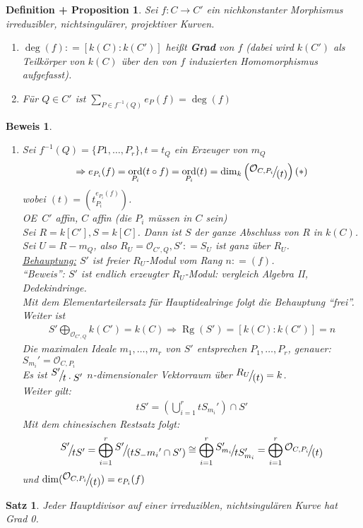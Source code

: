 \documentclass[a4paper,12pt]{report}
\theoremstyle{break}
\newtheorem{Satz}{Satz}
\newtheorem{DefProp}[Def]{Definition + Proposition}
\theoremstyle{nonumberbreak}
\theoremstyle{nonumberplain}
\newtheorem{Bew}{Beweis}
\newcommand{\emp}[1]{\textbf{\emph{#1}}}
\newcommand{\begriff}[1]{{\index{#1}}\emp{#1}}
\newcommand{\defeqr}[0]{\mathrel{\mathop:}=}
\DeclareMathOperator{\Rg}{Rg}
\DeclareMathOperator{\ord}{ord}
\newcommand{\FakRaum}[2]{
  \raisebox{0.7ex}{\ensuremath{#1}}
  \ensuremath{\mkern-3mu}\big/\ensuremath{\mkern-3mu}
  \raisebox{-0.6ex}{\ensuremath{#2}}}
\renewcommand{\OE}{O\!\!E~}
\begin{document}
\begin{DefProp}
  \label{defprop:19.4}
  Sei $f:C\longrightarrow C'$ ein nichkonstanter Morphismus irreduzibler, nichtsingulärer, projektiver Kurven.
  \begin{enumerate}
  \item $\deg(f)\defeqr[k(C):k(C')]$ heißt \begriff{Grad} von $f$ (dabei wird $k(C')$ als Teilkörper von $k(C)$
    über den von $f$ induzierten Homomorphismus aufgefasst).
  \item Für $Q\in C'$ ist $\sum_{P\in f^{-1}(Q)}e_P(f)=\deg(f)$
  \end{enumerate}
\end{DefProp}
\begin{Bew}
  \begin{enumerate}
  \item[b.)] Sei $f^{-1}(Q)=\{P1,\dots,P_r\}, t=t_Q$ ein Erzeuger von $m_Q$
    \begin{align*}
      \Rightarrow e_{P_i}(f)=\ord_{P_i}(t\circ f)=\ord_{P_i}(t)=\dim_k\left(\FakRaum{\mathcal O_{C,P_i}}{(t)}\right) (*)
    \end{align*}
    wobei $(t)=\left(t_{P_i}^{e_{P_i}(f)}\right)$. \\
    \OE $C'$ affin, $C$ affin (die $P_i$ müssen in $C$ sein) \\
    Sei $R=k[C'], S=k[C]$. Dann ist $S$ der ganze Abschluss von $R$ in $k(C)$. Sei $U=R-m_Q$, also $R_U=\mathcal O_{C',Q}, S'\defeqr S_U$
    ist ganz über $R_U$. \\
    \underline{Behauptung:} $S'$ ist freier $R_U$-Modul vom Rang $n\defeqr (f)$. \\
    ``Beweis'': $S'$ ist endlich erzeugter $R_U$-Modul: vergleich Algebra II, Dedekindringe. \\
    Mit dem Elementarteilersatz für Hauptidealringe folgt die Behauptung ``frei''. \\
    Weiter ist 
    \begin{align*}
      S'\bigoplus_{\mathcal O_{C',Q}}k(C')=k(C)\Rightarrow\Rg(S')=[k(C):k(C')]=n
    \end{align*}
    Die maximalen Ideale $m_1,\dots,m_r$ von $S'$ entsprechen $P_1,\dots,P_r$, genauer: $S_{m_i}'=\mathcal O_{C,P_i}$ \\
    Es ist $\FakRaum{S'}{t\cdot S'}$ $n$-dimensionaler Vektorraum über $\FakRaum{R_U}{(t)}=k$. \\
    Weiter gilt: 
    \begin{align*}
      tS'=\left(\bigcup_{i=1}^rtS_{m_i}'\right)\cap S'
    \end{align*}
    Mit dem chinesischen Restsatz folgt:
    \begin{align*}
      \FakRaum{S'}{tS'}=\bigoplus_{i=1}^r\FakRaum{S'}{(tS_-{m_i}'\cap S')}\cong\bigoplus_{i=1}^r\FakRaum{S_{m_i}'}{tS_{m_i}'}
      =\bigoplus_{i=1}^r\FakRaum{\mathcal O_{C,P_i}}{(t)}
    \end{align*}
    und $\dim(\FakRaum{\mathcal O_{C,P_i}}{(t)})=e_{P_i}(f)$
  \end{enumerate}
\end{Bew}
\begin{Satz}
\label{satz:7}
Jeder Hauptdivisor auf einer irreduziblen, nichtsingulären Kurve hat Grad 0.
\end{Satz}
\end{document}
